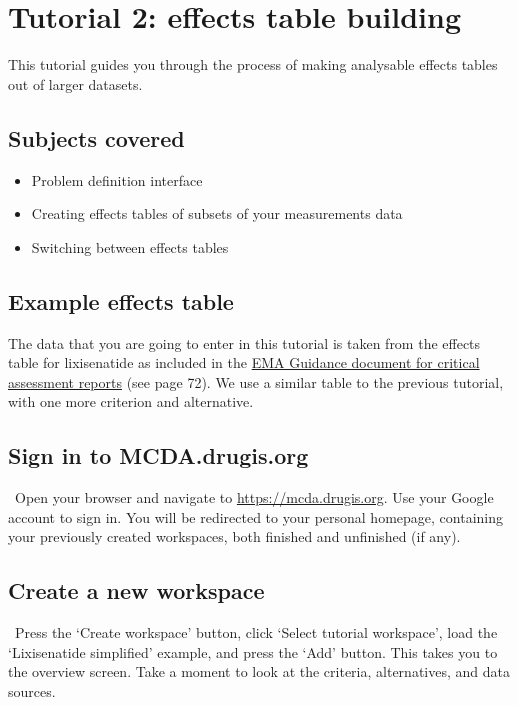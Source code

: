 \documentclass[00_mcda_tutorial.tex]{subfiles}
\begin{document}
\section*{Tutorial 2: effects table building}
\addtocounter{section}{1}

This tutorial guides you through the process of making analysable effects tables out of larger datasets.

\subsection*{Subjects covered}
\begin{itemize}
\item Problem definition interface
\item Creating effects tables of subsets of your measurements data
\item Switching between effects tables
\end{itemize}

\subsection*{Example effects table}
The data that you are going to enter in this tutorial is taken from the effects table for lixisenatide as included in the \href{https://www.ema.europa.eu/documents/template-form/day-80-assessment-report-overview-d120-loq-template-guidance-rev-1019_en.docx}{EMA Guidance document for critical assessment reports} (see page 72). We use a similar table to the previous tutorial, with one more criterion and alternative.

\subsection*{Sign in to MCDA.drugis.org}
\leftpointright \, Open your browser and navigate to \href{https://mcda.drugis.org}{https://mcda.drugis.org}. Use your Google account to sign in. You will be redirected to your personal homepage, containing your previously created workspaces, both finished and unfinished (if any).

\subsection*{Create a new workspace}
\leftpointright \, Press the ‘Create workspace’ button, click ‘Select tutorial workspace’, load the ‘Lixisenatide simplified’ example, and press the ‘Add’ button. This takes you to the overview screen. Take a moment to look at the criteria, alternatives, and data sources.
\end{document}

